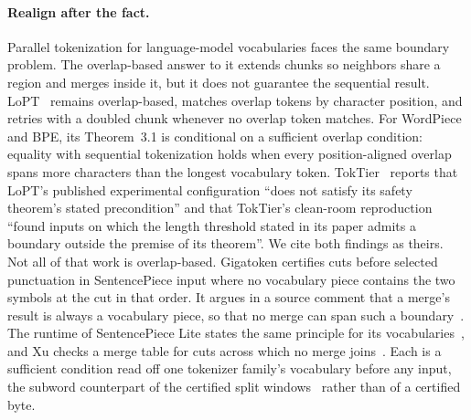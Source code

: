 \documentclass[11pt,a4paper]{article}
\theoremstyle{definition}
\theoremstyle{plain}
\begin{document}
\paragraph{Realign after the fact.} Parallel tokenization for language-model vocabularies faces the same boundary
problem. The overlap-based answer to it extends chunks so neighbors share a region and merges inside it, but it does not
guarantee the sequential result. LoPT~\cite{shao2026lopt} remains overlap-based, matches overlap tokens by character
position, and retries with a doubled chunk whenever no overlap token matches. For WordPiece and BPE, its Theorem~3.1 is
conditional on a sufficient overlap condition: equality with sequential tokenization holds when every position-aligned
overlap spans more characters than the longest vocabulary token. TokTier~\cite{zhang2026toktier} reports that LoPT's
published experimental configuration ``does not satisfy its safety theorem's stated precondition'' and that TokTier's
clean-room reproduction ``found inputs on which the length threshold stated in its paper admits a boundary outside the
premise of its theorem''. We cite both findings as theirs. Not all of that work is overlap-based. Gigatoken certifies
cuts before selected punctuation in SentencePiece input where no vocabulary piece contains the two symbols at the cut in
that order. It argues in a source comment that a merge's result is always a vocabulary piece, so that no merge can span
such a boundary~\cite{rod2026gigatoken}. The runtime of SentencePiece Lite states the same principle for its
vocabularies~\cite{sentencepiecelite2026}, and Xu checks a merge table for cuts across which no merge
joins~\cite{xu2026parallel}. Each is a sufficient condition read off one tokenizer family's vocabulary before any input,
the subword counterpart of the certified split windows~\cite{nidhogg2026splitwindows} rather than of a certified byte.
\end{document}
